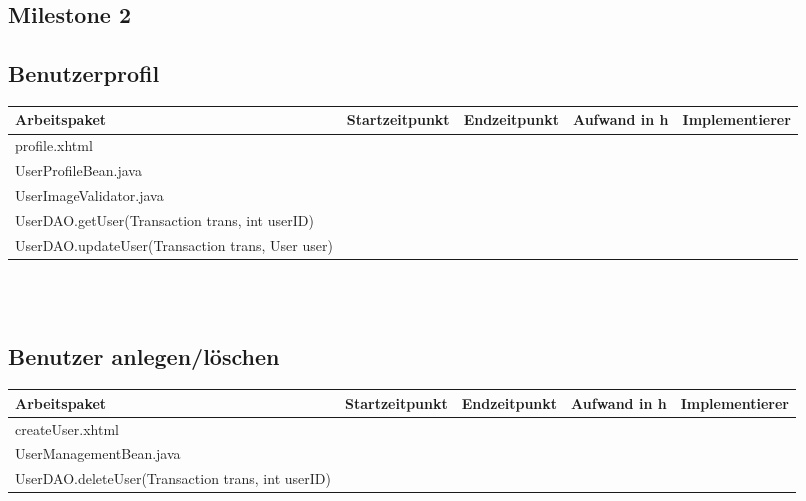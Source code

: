 \begin{landscape}
	\section{Milestone 2}
	
	\subsection{Benutzerprofil}
	\begin{tabular}{|p{10cm}|p{4cm}|p{3cm}|p{3cm}|p{3cm}|}
		\hline  \textbf{Arbeitspaket} & \textbf{Startzeitpunkt} & \textbf{Endzeitpunkt} & \textbf{Aufwand in h} & \textbf{Implementierer} \\ 
		\hline   profile.xhtml                                         &                            &                             &                     &\\
		\hline   UserProfileBean.java                                  &                            &                             &                     &\\
		\hline   UserImageValidator.java                               &                            &                             &                     &\\ 
		\hline   UserDAO.getUser(Transaction trans, int userID)        &                            &                             &                     &\\ 
		\hline   UserDAO.updateUser(Transaction trans, User user)      &                            &                             &                     &\\ 
		\hline 
	\end{tabular} \ \\
	\ \\
	
	\subsection{Benutzer anlegen/löschen}
	\begin{tabular}{|p{10cm}|p{4cm}|p{3cm}|p{3cm}|p{3cm}|}
		\hline  \textbf{Arbeitspaket} & \textbf{Startzeitpunkt} & \textbf{Endzeitpunkt} & \textbf{Aufwand in h} & \textbf{Implementierer} \\ 
		\hline   createUser.xhtml                                      &                            &                             &                     &\\
		\hline   UserManagementBean.java                               &                            &                             &                     &\\
		\hline   UserDAO.deleteUser(Transaction trans, int userID)     &                            &                             &                     &\\
		\hline 
	\end{tabular} \ \\
	\ \\
	

\end{landscape}
